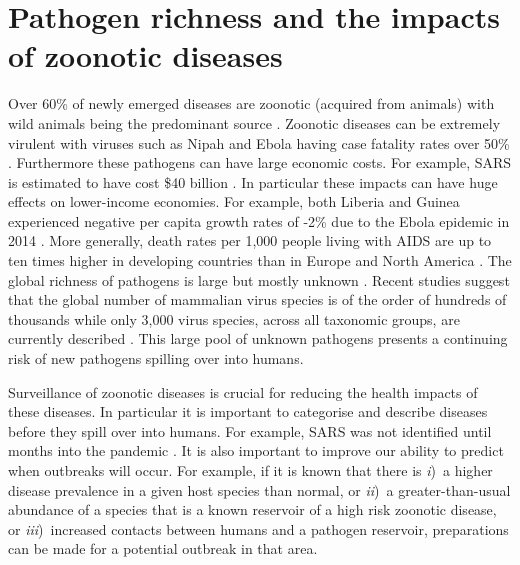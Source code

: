 
\section{Pathogen richness and the impacts of zoonotic diseases}




Over 60\% of newly emerged diseases are zoonotic (acquired from animals) with wild animals being the predominant source \cite{jones2008global, woolhouse2006host, taylor2001risk}.
Zoonotic diseases can be extremely virulent with viruses such as Nipah  and Ebola having case fatality rates over 50\% \cite{luby2009recurrent, lefebvre2014case}.
Furthermore these pathogens can have large economic costs.
For example, SARS is estimated to have cost \$40 billion \cite{knobler2004learning}.
In particular these impacts can have huge effects on lower-income economies.
For example, both Liberia and Guinea experienced negative per capita growth rates of -2\% due to the Ebola epidemic in 2014 \cite{ebolaWorldbank, ebola2015worldbank}.
More generally, death rates per 1,000 people living with AIDS are up to ten times higher in developing countries than in Europe and North America \cite{granich2015trends}.
The global richness of pathogens is large but mostly unknown \cite{poulin2014parasite}.
Recent studies suggest that the global number of mammalian virus species is of the order of hundreds of thousands \cite{anthony2013strategy} while only 3,000 virus species, across all taxonomic groups, are currently described \cite{ICTV}.
This large pool of unknown pathogens presents a continuing risk of new pathogens spilling over into humans.



Surveillance of zoonotic diseases is crucial for reducing the health impacts of these diseases.
In particular it is important to categorise and describe diseases before they spill over into humans.
For example, SARS was not identified until months into the pandemic \cite{drosten2003identification}. 
It is also important to improve our ability to predict when outbreaks will occur. 
For example, if it is known that there is \textit{i})~a higher disease prevalence in a given host species than normal, or \textit{ii})~a greater-than-usual abundance of a species that is a known reservoir of a high risk zoonotic disease, or \textit{iii})~increased contacts between humans and a pathogen reservoir, preparations can be made for a potential outbreak in that area.

